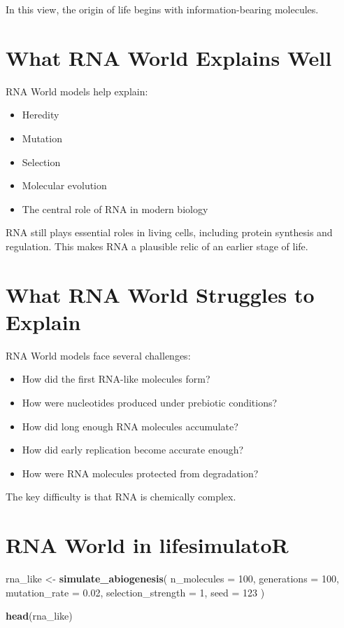 \documentclass[
  oneside,
  openany]{book}
\newenvironment{Shaded}{\begin{snugshade}}{\end{snugshade}}
\newcommand{\AttributeTok}[1]{\textcolor[rgb]{0.13,0.29,0.53}{#1}}
\newcommand{\DecValTok}[1]{\textcolor[rgb]{0.00,0.00,0.81}{#1}}
\newcommand{\FloatTok}[1]{\textcolor[rgb]{0.00,0.00,0.81}{#1}}
\newcommand{\FunctionTok}[1]{\textcolor[rgb]{0.13,0.29,0.53}{\textbf{#1}}}
\newcommand{\NormalTok}[1]{#1}
\newcommand{\OtherTok}[1]{\textcolor[rgb]{0.56,0.35,0.01}{#1}}
\providecommand{\tightlist}{%
  \setlength{\itemsep}{0pt}\setlength{\parskip}{0pt}}
\begin{document}
In this view, the origin of life begins with information-bearing molecules.

\section{What RNA World Explains Well}\label{what-rna-world-explains-well}

RNA World models help explain:

\begin{itemize}
\tightlist
\item
  Heredity
\item
  Mutation
\item
  Selection
\item
  Molecular evolution
\item
  The central role of RNA in modern biology
\end{itemize}

RNA still plays essential roles in living cells, including protein synthesis and regulation. This makes RNA a plausible relic of an earlier stage of life.

\section{What RNA World Struggles to Explain}\label{what-rna-world-struggles-to-explain}

RNA World models face several challenges:

\begin{itemize}
\tightlist
\item
  How did the first RNA-like molecules form?
\item
  How were nucleotides produced under prebiotic conditions?
\item
  How did long enough RNA molecules accumulate?
\item
  How did early replication become accurate enough?
\item
  How were RNA molecules protected from degradation?
\end{itemize}

The key difficulty is that RNA is chemically complex.

\section{RNA World in lifesimulatoR}\label{rna-world-in-lifesimulator}

\begin{Shaded}
\begin{Highlighting}[]
\NormalTok{rna\_like }\OtherTok{\textless{}{-}} \FunctionTok{simulate\_abiogenesis}\NormalTok{(}
  \AttributeTok{n\_molecules =} \DecValTok{100}\NormalTok{,}
  \AttributeTok{generations =} \DecValTok{100}\NormalTok{,}
  \AttributeTok{mutation\_rate =} \FloatTok{0.02}\NormalTok{,}
  \AttributeTok{selection\_strength =} \DecValTok{1}\NormalTok{,}
  \AttributeTok{seed =} \DecValTok{123}
\NormalTok{)}

\FunctionTok{head}\NormalTok{(rna\_like)}
\end{Highlighting}
\end{Shaded}
\end{document}
